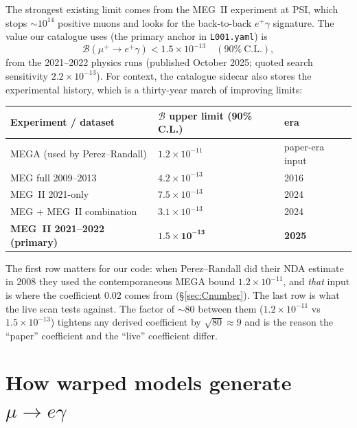 \documentclass[11pt]{article}
\newcommand{\BR}{\mathcal{B}}
\newcommand{\code}[1]{\texttt{#1}}
\theoremstyle{definition}
\begin{document}
The strongest existing limit comes from the MEG~II experiment at PSI, which
stops $\sim 10^{14}$ positive muons and looks for the back-to-back $e^+\gamma$
signature. The value our catalogue uses (the primary anchor in \code{L001.yaml})
is
\begin{equation}
\boxed{\;\BR(\mu^+\to e^+\gamma) < 1.5\times10^{-13}\quad (90\%\ \text{C.L.}),\;}
\label{eq:megii}
\end{equation}
from the 2021--2022 physics runs (published October 2025; quoted search
sensitivity $2.2\times10^{-13}$). For context, the catalogue sidecar also stores
the experimental history, which is a thirty-year march of improving limits:

\begin{center}
\begin{tabular}{lll}
\toprule
Experiment / dataset & $\BR$ upper limit (90\% C.L.) & era \\
\midrule
MEGA (used by Perez--Randall) & $1.2\times10^{-11}$ & paper-era input \\
MEG full 2009--2013          & $4.2\times10^{-13}$ & 2016 \\
MEG~II 2021-only             & $7.5\times10^{-13}$ & 2024 \\
MEG + MEG~II combination     & $3.1\times10^{-13}$ & 2024 \\
\textbf{MEG~II 2021--2022 (primary)} & $\mathbf{1.5\times10^{-13}}$ & \textbf{2025} \\
\bottomrule
\end{tabular}
\end{center}

\noindent The first row matters for our code: when Perez--Randall did their NDA
estimate in 2008 they used the contemporaneous MEGA bound
$1.2\times10^{-11}$, and \emph{that} input is where the coefficient $0.02$ comes
from (\S\ref{sec:Cnumber}). The last row is what the live scan tests against. The
factor of $\sim 80$ between them ($1.2\times10^{-11}$ vs $1.5\times10^{-13}$)
tightens any derived coefficient by $\sqrt{80}\approx 9$ and is the reason the
``paper'' coefficient and the ``live'' coefficient differ.

\part{How warped models generate $\mu\to e\gamma$}
\label{part:rs}
\end{document}
